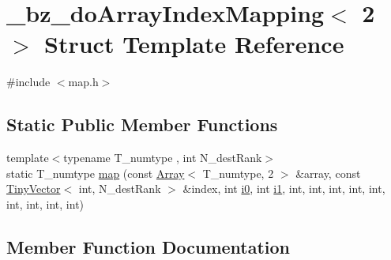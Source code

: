 \hypertarget{struct__bz__doArrayIndexMapping_3_012_01_4}{}\section{\+\_\+bz\+\_\+do\+Array\+Index\+Mapping$<$ 2 $>$ Struct Template Reference}
\label{struct__bz__doArrayIndexMapping_3_012_01_4}


{\ttfamily \#include $<$map.\+h$>$}

\subsection*{Static Public Member Functions}
\begin{DoxyCompactItemize}
\item 
{\footnotesize template$<$typename T\+\_\+numtype , int N\+\_\+dest\+Rank$>$ }\\static T\+\_\+numtype \hyperlink{struct__bz__doArrayIndexMapping_3_012_01_4_a38c0f37c405839785d08d67099dd3ad4}{map} (const \hyperlink{classArray}{Array}$<$ T\+\_\+numtype, 2 $>$ \&array, const \hyperlink{classTinyVector}{Tiny\+Vector}$<$ int, N\+\_\+dest\+Rank $>$ \&index, int \hyperlink{cephes_8h_aacd2643d920288e61be16787561a4514}{i0}, int \hyperlink{cephes_8h_ab24474d03df1f9adf1700c2c1badd1a5}{i1}, int, int, int, int, int, int, int, int, int)
\end{DoxyCompactItemize}


\subsection{Member Function Documentation}
\hypertarget{struct__bz__doArrayIndexMapping_3_012_01_4_a38c0f37c405839785d08d67099dd3ad4}{}
